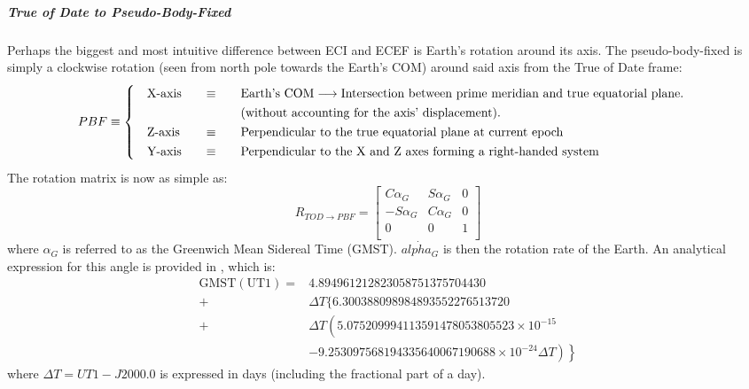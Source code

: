 		\subparagraph{True of Date to Pseudo-Body-Fixed\\}
		\indent Perhaps the biggest and most intuitive difference between ECI and ECEF is Earth's rotation around its axis. The pseudo-body-fixed is simply a clockwise rotation (seen from north pole towards the Earth's COM) around said axis from the True of Date frame:  \\
		\[
		\arraycolsep=10pt
		\def\arraystretch{1.3}
		PBF\equiv\left\{
		\begin{array}{lll}
		\text{X-axis} 	& \equiv 	& \text{Earth's COM} \longrightarrow \text{Intersection between prime meridian and true equatorial plane.} \\
		 				&  	 		& \text{(without accounting for the axis' displacement).} \\
		\text{Z-axis} 	& \equiv 	& \text{Perpendicular to the true equatorial plane at current epoch} \\
		\text{Y-axis} 	& \equiv 	& \text{Perpendicular to the X and Z axes forming a right-handed system} \\
		\end{array}
		\right.
		\]
		\indent The rotation matrix is now as simple as:
		\begin{equation}
		R_{TOD\rightarrow PBF} = 
		\left[ 
		\begin{array}{lll}
		C \alpha_G 		& S\alpha_G 	& 0 \\
		-S\alpha_G 		& C\alpha_G 	& 0 \\
		0 				& 0 			& 1 \\
		\end{array}
		\right]
		\label{eq: R_TOD_PBF}
		\end{equation}
		\noindent where $\alpha_G$ is referred to as the Greenwich Mean Sidereal Time (GMST). $\dot{alpha_G}$ is then the rotation rate of the Earth. An analytical expression for this angle is provided in \cite{Tapley}, which is:
		\[
		\begin{aligned}
		\mathrm{GMST}(\mathrm{UT} 1)=& 4.894961212823058751375704430 \\
				+& \Delta T\{6.300388098984893552276513720\\
				+& \Delta T\left(5.075209994113591478053805523 \times 10^{-15}\right.\\
				&\left.\left.-9.253097568194335640067190688 \times 10^{-24} \Delta T\right)\right\}
				\end{aligned}
		\]
		\noindent where $\Delta T = UT1 - J2000.0$ is expressed in days (including the fractional part of a day).
